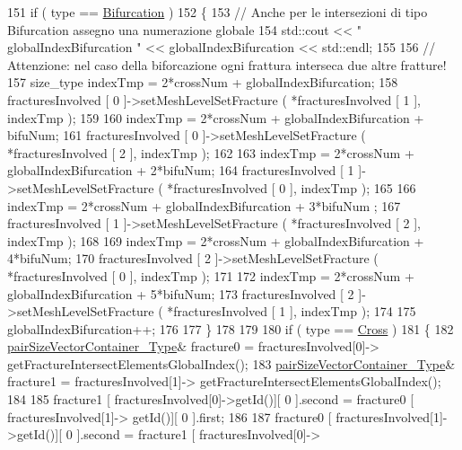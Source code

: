 \begin{DoxyCode}
151            \textcolor{keywordflow}{if} ( type == \hyperlink{classFractureIntersect_a9a4e4a784fa4c8e359767ed543f89dc5a4d466b3d3de0af7e18732b6f765bb1af}{Bifurcation} )
152            \{
153                \textcolor{comment}{// Anche per le intersezioni di tipo Bifurcation assegno una numerazione globale}
154                std::cout << \textcolor{stringliteral}{" globalIndexBifurcation "} << globalIndexBifurcation << std::endl;
155                
156                \textcolor{comment}{// Attenzione: nel caso della biforcazione ogni frattura interseca due altre fratture!}
157                size\_type indexTmp = 2*crossNum + globalIndexBifurcation;
158                fracturesInvolved [ 0 ]->setMeshLevelSetFracture ( *fracturesInvolved [ 1 ], indexTmp );
159                
160                indexTmp = 2*crossNum + globalIndexBifurcation + bifuNum;
161                fracturesInvolved [ 0 ]->setMeshLevelSetFracture ( *fracturesInvolved [ 2 ], indexTmp );
162 
163                indexTmp = 2*crossNum + globalIndexBifurcation + 2*bifuNum;
164                fracturesInvolved [ 1 ]->setMeshLevelSetFracture ( *fracturesInvolved [ 0 ], indexTmp );
165                
166                indexTmp = 2*crossNum + globalIndexBifurcation + 3*bifuNum ;
167                fracturesInvolved [ 1 ]->setMeshLevelSetFracture ( *fracturesInvolved [ 2 ], indexTmp );
168 
169                indexTmp = 2*crossNum + globalIndexBifurcation + 4*bifuNum;
170                fracturesInvolved [ 2 ]->setMeshLevelSetFracture ( *fracturesInvolved [ 0 ], indexTmp );
171                
172                indexTmp = 2*crossNum + globalIndexBifurcation + 5*bifuNum;
173                fracturesInvolved [ 2 ]->setMeshLevelSetFracture ( *fracturesInvolved [ 1 ], indexTmp );
174 
175                globalIndexBifurcation++;
176 
177            \}
178 
179         
180            \textcolor{keywordflow}{if} ( type == \hyperlink{classFractureIntersect_a9a4e4a784fa4c8e359767ed543f89dc5a743fef1af81c0e61412fafb9438b380e}{Cross} )
181            \{
182                \hyperlink{Core_8h_a9bc476e433f99b82a9c2b8560735c7b5}{pairSizeVectorContainer\_Type}& fracture0 = fracturesInvolved[0]->
      getFractureIntersectElementsGlobalIndex();
183                \hyperlink{Core_8h_a9bc476e433f99b82a9c2b8560735c7b5}{pairSizeVectorContainer\_Type}& fracture1 = fracturesInvolved[1]->
      getFractureIntersectElementsGlobalIndex();
184                 
185                 fracture1 [ fracturesInvolved[0]->getId()][ 0 ].second = fracture0 [ fracturesInvolved[1]->
      getId()][ 0 ].first;
186     
187                 fracture0 [ fracturesInvolved[1]->getId()][ 0 ].second = fracture1 [ fracturesInvolved[0]->

\end{DoxyCode}
